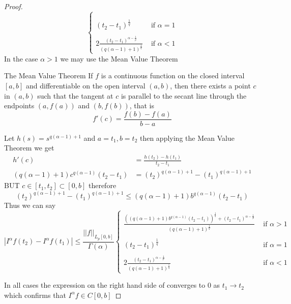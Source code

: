 \begin{proof}[Proof]
\[\begin{cases}
            \\\\
            \displaystyle \left(t_2 - t_1\right)^{\frac{1}{q}} & \text{ if } \alpha =1
            \\\\
            \displaystyle 2\frac{(t_2-t_1)^{\alpha-\frac{1}{p}}}{\left(q(\alpha-1)+1\right)^{\frac{1}{q}}}
            & \text{ if } \alpha <1
        \end{cases}
    \] 
    In the case $\alpha > 1$ we may use the Mean Value Theorem
    \begin{enrichment*}{The Mean Value Theorem}
        If $f$ is a continuous function on the closed interval $[a,b]$ and differentiable on the open interval 
        $(a,b)$, then there exists a point $c$ in $(a,b)$ such that the tangent at 
        $c$ is parallel to the secant line through the endpoints 
        $(a,f(a))$ and  $(b,f(b))$, that is
        \[
            f'(c) = \frac{f(b)-f(a)}{b-a}
        \]
    \end{enrichment*}
    Let $h(s) = s^{q(\alpha-1)+1}$ and $ a=t_1 , b=t_2 $ then applying the Mean Value Theorem we get 
    \begin{align*}
        h'(c) &= \frac{h(t_2)-h(t_1)}{t_2-t_1}
        \\
        (q(\alpha-1)+1) c^{q(\alpha-1)}(t_2-t_1) &= (t_2)^{q(\alpha-1)+1}-(t_1)^{q(\alpha-1)+1} 
    \end{align*}
    BUT $c \in [t_1,t_2] \subset [0,b]$ therefore 
    \[
        (t_2)^{q(\alpha-1)+1}-(t_1)^{q(\alpha-1)+1}  \leq (q(\alpha-1)+1) b^{q(\alpha-1)}(t_2-t_1)
    \]
    Thus we can say
    \[
        |I^\alpha f(t_2)-I^\alpha f(t_1)| \leq \frac{||f||_{L_p[0,b]}}{\Gamma(\alpha)}
        \begin{cases}
            \displaystyle \frac{ \left((q(\alpha-1)+1) b^{q(\alpha-1)}(t_2-t_1)\right)^{\frac{1}{q}} + (t_2-t_1)^{\alpha-\frac{1}{p}}}{\left(q(\alpha-1)+1\right)^{\frac{1}{q}}}
            & \text{ if } \alpha >1
            \\\\
            \displaystyle \left(t_2 - t_1\right)^{\frac{1}{q}} & \text{ if } \alpha =1
            \\\\
            \displaystyle 2\frac{(t_2-t_1)^{\alpha-\frac{1}{p}}}{\left(q(\alpha-1)+1\right)^{\frac{1}{q}}}
            & \text{ if } \alpha <1
        \end{cases}
    \] 

    In all cases the expression on the right hand side of converges to 0 
    as $t_1 \to t_2$ which confirms that $I^\alpha f \in C[0, b]$


\end{proof}
